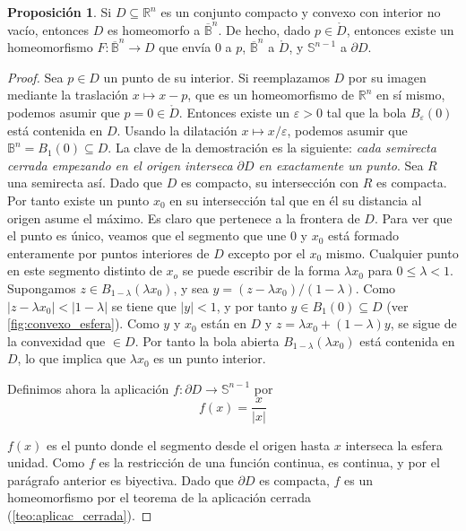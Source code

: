 \documentclass[10pt]{report}
\newcommand{\R}{\mathbb{R}}
\theoremstyle{definition}
\newtheorem{prop}[defin]{Proposición}
\begin{document}
\begin{prop}%
\label{teo:convexo_homeom_esfera} 
Si $D\subseteq \R^n$ es un conjunto compacto y convexo con interior no vacío, entonces $D$ es homeomorfo a $\overline{\mathbb{B}}^n.$ De hecho, dado $p\in \mathring{D}$, entonces existe un homeomorfismo $F:\overline{\mathbb{B}}^n\to D$ que envía $0$ a $p$, $\overline{\mathbb{B}}^n$ a $\mathring{D}$, y $\mathbb{S}^{n-1}$ a $\partial D$.
\end{prop}
\begin{proof}
Sea $p\in D$ un punto de su interior. Si reemplazamos $D$ por su imagen mediante la traslación $x\mapsto x-p$, que es un homeomorfismo de $\R^n$ en sí mismo, podemos asumir que $p=0\in \mathring{D}$. Entonces existe un $\varepsilon >0 $ tal que la bola $B_{\varepsilon}(0)$ está contenida en $D$. Usando la dilatación $x\mapsto x/\varepsilon$, podemos asumir que $\mathbb{B}^n = B_ 1(0) \subseteq D$.
La clave de la demostración es la siguiente: \emph{cada semirecta cerrada empezando en el origen interseca $\partial
D$ en exactamente un punto}. Sea $R$ una semirecta así. Dado que $D$ es compacto, su intersección con $R$ es compacta. Por tanto existe un punto $x_0$ en su intersección tal que en él su distancia al origen asume el máximo. Es claro %
que pertenece a la frontera de $D$. Para ver que el punto es único, veamos que el segmento que une $0$ y $x_0$ está formado enteramente por puntos interiores de $D$ excepto por el $x_0$ mismo. Cualquier punto en este segmento distinto de $x_o$ se puede escribir de la forma $\lambda x_0 $ para $0\leq \lambda <1. $ Supongamos $z\in B_{1-\lambda}(\lambda x_0)$, y sea $y=(z-\lambda x_0)/(1-\lambda )$. Como $|z-\lambda x_0|<|1-\lambda|$ se tiene que $|y|<1$, y por tanto $y\in B_ 1(0)\subseteq D$ (ver \autoref{fig:convexo_esfera}). Como $y$ y $x_0$ están en $D$ y $z=\lambda x_0 + (1-\lambda )y$, se sigue de la convexidad que $\in D$. Por tanto la bola abierta $B_{1-\lambda}(\lambda x_0)$ está contenida en $D$, lo que implica que $\lambda x_0$ es un punto interior.

Definimos ahora la aplicación $f:\partial D \to \mathbb{S}^{n-1}$ por 
$$f(x)=\frac{x}{|x|}$$

$f(x)$ es el punto donde el segmento desde el origen hasta $x$ interseca la esfera unidad. Como $f$ es la restricción de una función continua, es continua, y por el parágrafo anterior es biyectiva. Dado que $\partial D$ es compacta, $f$ es un homeomorfismo por el teorema de la aplicación cerrada (\autoref{teo:aplicac_cerrada}).


\end{proof}
\end{document}
